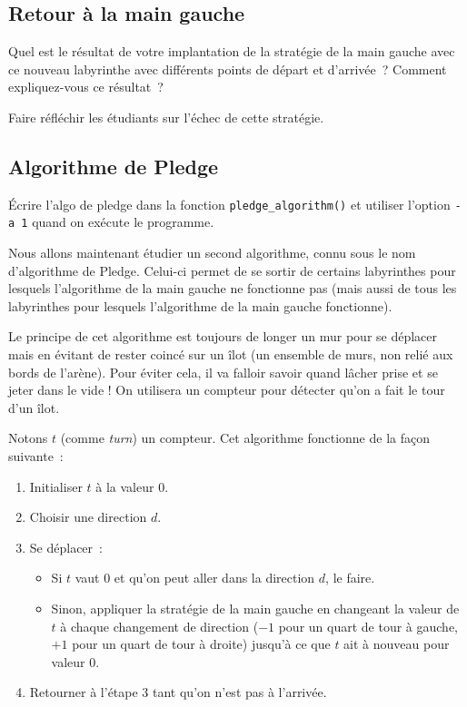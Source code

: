 \documentclass[a4paper]{article}
\newenvironment{enseignants}[1]{\noindent\color{blue}{\bf #1}}{}
\begin{document}
\subsection{Retour à la main gauche}

Quel est le résultat de votre implantation de la stratégie de la main gauche avec ce nouveau labyrinthe avec différents points de départ et d'arrivée~? Comment expliquez-vous ce résultat~?

\begin{enseignants}{Suite de la réflexion précédente~:}
Faire réfléchir les étudiants sur l’échec de cette stratégie.
\end{enseignants}

\subsection{Algorithme de Pledge}

\begin{enseignants}{Utilisation du programme~:}
Écrire l'algo de pledge dans la fonction \verb|pledge_algorithm()| et utiliser l'option \verb|-a 1| quand on exécute le programme.
\end{enseignants}

Nous allons maintenant étudier un second algorithme, connu sous le nom d’algorithme de Pledge.
Celui-ci permet de se sortir de certains labyrinthes pour lesquels l'algorithme de la main gauche ne fonctionne pas (mais aussi de tous les labyrinthes pour lesquels l'algorithme de la main gauche fonctionne).

Le principe de cet algorithme est toujours de longer un mur pour se déplacer mais en évitant de rester coincé sur un îlot (un ensemble de murs, non relié aux bords de l'arène).
Pour éviter cela, il va falloir savoir quand lâcher prise et se jeter dans le vide !
On utilisera un compteur pour détecter qu'on a fait le tour d'un îlot.

Notons $t$ (comme \emph{turn}) un compteur. Cet algorithme fonctionne de la façon suivante~:
\begin{enumerate}
\item Initialiser $t$ à la valeur $0$.
\item Choisir une direction $d$.
\item Se déplacer~:
  \begin{itemize}
  \item Si $t$ vaut $0$ et qu'on peut aller dans la direction $d$, le faire.
  \item Sinon, appliquer la stratégie de la main gauche en changeant la valeur de $t$ à chaque changement de direction ($-1$ pour un quart de tour à gauche, $+1$ pour un quart de tour à droite) jusqu'à ce que $t$ ait à nouveau pour valeur $0$.
  \end{itemize}
\item Retourner à l'étape 3 tant qu'on n'est pas à l'arrivée.
\end{enumerate}
\end{document}
